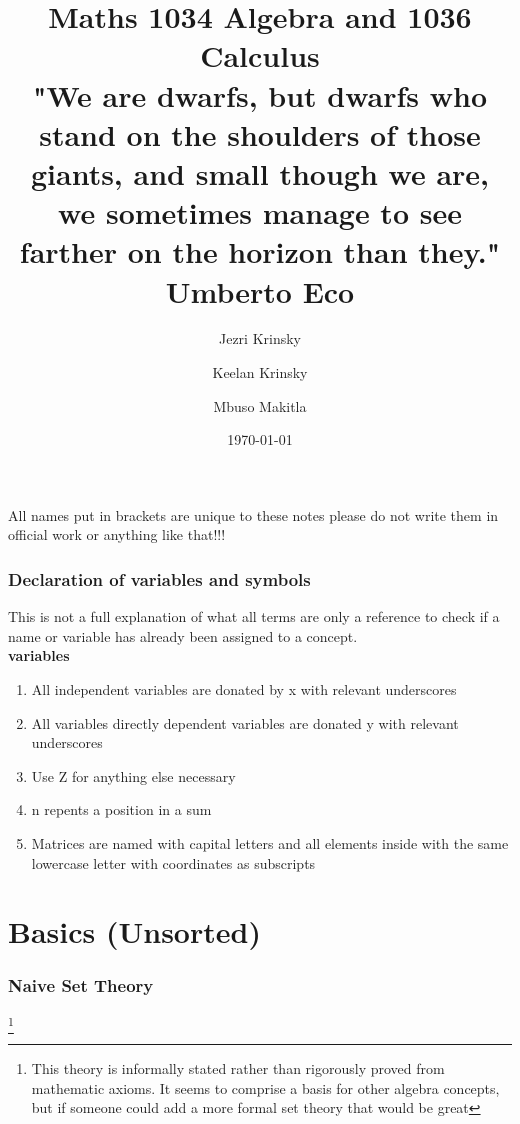 \documentclass[12pt, a4paper,oneside]{book}
\begin{document}
                                              
	 \title{Maths 1034 Algebra and 1036 Calculus  \\ \normalsize  "We are dwarfs, but dwarfs who stand on 			the shoulders of those giants, and small though we are, we sometimes manage to see farther on 				the horizon than they." \\ \normalsize Umberto Eco } 
	
    \date{\today} 
	
    \author{Jezri Krinsky \and Keelan Krinsky 
    	\and Mbuso Makitla}                                               
	
    \maketitle
		{\huge All names put in brackets are unique to these notes please do not write them in official work or anything like that!!!}
    
    \tableofcontents
    	\section*{Declaration of variables and symbols}
   			 This is not a full explanation of what all terms are only a reference to check if a name or 				variable has already been assigned to a concept.\\ 
   
   			\textbf{variables} 
    			\begin{enumerate}
    				\item{All independent variables are donated by x with relevant underscores}
   					 \item{All variables directly dependent variables are donated y with relevant 									underscores}
    				\item{Use Z for anything else necessary}
    				\item{n repents a position in a sum}
   					 \item{Matrices are named with capital letters and all elements inside with the same 							lowercase letter with coordinates as subscripts}
 			  \end{enumerate}
	
    \part{Basics (Unsorted)}
		\section{Naive Set Theory}\footnote{This theory is informally stated rather than 								rigorously proved from mathematic axioms. It seems to comprise a basis for other 						algebra concepts, but if someone could add a more formal set theory that would be 						great}
\end{document}
